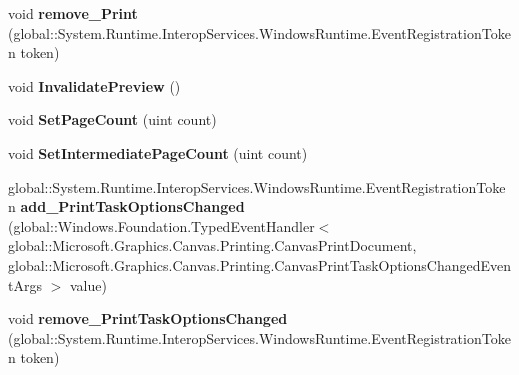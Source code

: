 \begin{DoxyCompactItemize}
void {\bfseries remove\+\_\+\+Print} (global\+::\+System.\+Runtime.\+Interop\+Services.\+Windows\+Runtime.\+Event\+Registration\+Token token)
\item 
\mbox{\label{interface_microsoft_1_1_graphics_1_1_canvas_1_1_printing_1_1_i_canvas_print_document_a6624a11a39bdacc1332f7370fe4e289a}} 
void {\bfseries Invalidate\+Preview} ()
\item 
\mbox{\label{interface_microsoft_1_1_graphics_1_1_canvas_1_1_printing_1_1_i_canvas_print_document_a27ce0b5fa1108240d85779236c1ab571}} 
void {\bfseries Set\+Page\+Count} (uint count)
\item 
\mbox{\label{interface_microsoft_1_1_graphics_1_1_canvas_1_1_printing_1_1_i_canvas_print_document_a7f760cb71cc746fd247a12e55ba416a1}} 
void {\bfseries Set\+Intermediate\+Page\+Count} (uint count)
\item 
\mbox{\label{interface_microsoft_1_1_graphics_1_1_canvas_1_1_printing_1_1_i_canvas_print_document_a1de4b2e4a0bbe65d5a50f8cfd5b275ff}} 
global\+::\+System.\+Runtime.\+Interop\+Services.\+Windows\+Runtime.\+Event\+Registration\+Token {\bfseries add\+\_\+\+Print\+Task\+Options\+Changed} (global\+::\+Windows.\+Foundation.\+Typed\+Event\+Handler$<$ global\+::\+Microsoft.\+Graphics.\+Canvas.\+Printing.\+Canvas\+Print\+Document, global\+::\+Microsoft.\+Graphics.\+Canvas.\+Printing.\+Canvas\+Print\+Task\+Options\+Changed\+Event\+Args $>$ value)
\item 
\mbox{\label{interface_microsoft_1_1_graphics_1_1_canvas_1_1_printing_1_1_i_canvas_print_document_a1da96a2ebf4b67369628fa017a384b71}} 
void {\bfseries remove\+\_\+\+Print\+Task\+Options\+Changed} (global\+::\+System.\+Runtime.\+Interop\+Services.\+Windows\+Runtime.\+Event\+Registration\+Token token)
\item 
\mbox{\label{interface_microsoft_1_1_graphics_1_1_canvas_1_1_printing_1_1_i_canvas_print_document_abaff1fcd43de732d25ae88fef48a23a9}} 

\end{DoxyCompactItemize}

